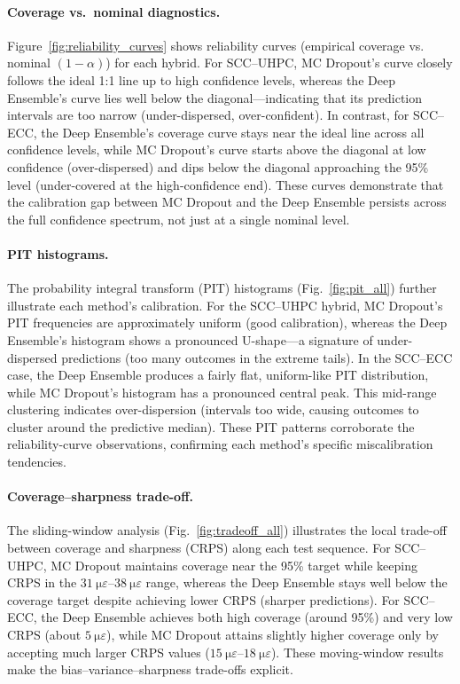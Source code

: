 \documentclass{article}
\begin{document}
\paragraph{Coverage vs.\ nominal diagnostics.} Figure~\ref{fig:reliability_curves} shows reliability curves (empirical coverage vs. nominal $(1-\alpha)$) for each hybrid. For SCC–UHPC, MC Dropout’s curve closely follows the ideal 1:1 line up to high confidence levels, whereas the Deep Ensemble’s curve lies well below the diagonal—indicating that its prediction intervals are too narrow (under-dispersed, over-confident). In contrast, for SCC–ECC, the Deep Ensemble’s coverage curve stays near the ideal line across all confidence levels, while MC Dropout’s curve starts above the diagonal at low confidence (over-dispersed) and dips below the diagonal approaching the 95\% level (under-covered at the high-confidence end). These curves demonstrate that the calibration gap between MC Dropout and the Deep Ensemble persists across the full confidence spectrum, not just at a single nominal level.

\paragraph{PIT histograms.} The probability integral transform (PIT) histograms (Fig.~\ref{fig:pit_all}) further illustrate each method’s calibration. For the SCC–UHPC hybrid, MC Dropout’s PIT frequencies are approximately uniform (good calibration), whereas the Deep Ensemble’s histogram shows a pronounced U-shape—a signature of under-dispersed predictions (too many outcomes in the extreme tails). In the SCC–ECC case, the Deep Ensemble produces a fairly flat, uniform-like PIT distribution, while MC Dropout’s histogram has a pronounced central peak. This mid-range clustering indicates over-dispersion (intervals too wide, causing outcomes to cluster around the predictive median). These PIT patterns corroborate the reliability-curve observations, confirming each method’s specific miscalibration tendencies.

\paragraph{Coverage–sharpness trade-off.} The sliding-window analysis (Fig.~\ref{fig:tradeoff_all}) illustrates the local trade-off between coverage and sharpness (CRPS) along each test sequence. For SCC–UHPC, MC Dropout maintains coverage near the 95\% target while keeping CRPS in the $\SIrange{31}{38}{\micro\varepsilon}$ range, whereas the Deep Ensemble stays well below the coverage target despite achieving lower CRPS (sharper predictions). For SCC–ECC, the Deep Ensemble achieves both high coverage (around 95\%) and very low CRPS (about $\SI{5}{\micro\varepsilon}$), while MC Dropout attains slightly higher coverage only by accepting much larger CRPS values ($\SIrange{15}{18}{\micro\varepsilon}$). These moving-window results make the bias–variance–sharpness trade-offs explicit.
\end{document}
